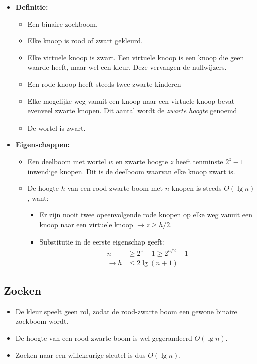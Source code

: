 \label{sec:rood-zwarte bomen}
\begin{itemize}
    \item \textbf{Definitie:}
    \begin{itemize}
        \item Een binaire zoekboom.
        \item Elke knoop is rood of zwart gekleurd.
        \item Elke virtuele knoop is zwart. Een virtuele knoop is een knoop die geen waarde heeft, maar wel een kleur. Deze vervangen de nullwijzers.
        \item Een rode knoop heeft steeds twee zwarte kinderen
        \item Elke mogelijke weg vanuit een knoop naar een virtuele knoop bevat evenveel zwarte knopen. Dit aantal wordt de \textit{zwarte hoogte} genoemd
        \item De wortel is zwart.
    \end{itemize}
    \item \textbf{Eigenschappen:}
    \begin{itemize}
        \item Een deelboom met wortel $w$ en zwarte hoogte $z$ heeft tenminste $2^z - 1$ inwendige knopen. Dit is de deelboom waarvan elke knoop zwart is.
        \item De hoogte $h$ van een rood-zwarte boom met $n$ knopen is steeds $O(\lg n)$, want:
        \begin{itemize}
            \item Er zijn nooit twee opeenvolgende rode knopen op elke weg vanuit een knoop naar een virtuele knoop $\rightarrow z \geq h/2$.
            \item Substitutie in de eerste eigenschap geeft:
            \begin{align*}
                n &\geq 2^z - 1 \geq 2^{h/2} - 1 \\
                \rightarrow h & \leq 2\lg(n + 1)
            \end{align*}
        \end{itemize}
    \end{itemize}

\end{itemize}
\subsection{Zoeken}
\begin{itemize}
    \item De kleur speelt geen rol, zodat de rood-zwarte boom een gewone binaire zoekboom wordt.
    \item De hoogte van een rood-zwarte boom is wel gegerandeerd $O(\lg n)$.
    \item Zoeken naar een willekeurige sleutel is dus $O(\lg n)$.
\end{itemize}

